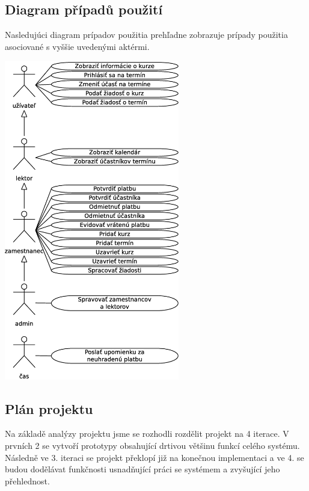 \documentclass[12pt,a4paper,titlepage,final]{report}
\begin{document}
		
		
		
	\subsection{Diagram případů použití}
	
Nasledujúci diagram prípadov použitia prehľadne zobrazuje prípady použitia asociované s vyššie uvedenými aktérmi.
		\begin{center}
			\captionsetup{type=figure}
			\includegraphics[height=14cm]{img/use_case.eps}
		\end{center}
		
	\subsection{Plán projektu}
	
Na základě analýzy projektu jsme se rozhodli rozdělit projekt na 4 iterace. V prvních 2 se vytvoří prototypy obsahující drtivou většinu funkcí celého systému. Následně ve 3. iteraci se projekt překlopí již na konečnou implementaci a ve 4. se budou dodělávat funkčnosti usnadňující práci se systémem a zvyšující jeho přehlednost.
	
\end{document}
